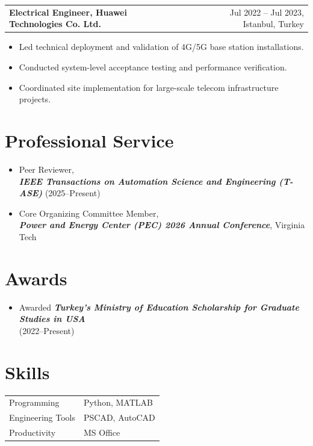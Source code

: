\documentclass[a4paper,12pt]{article}
\makeatletter
\newenvironment{joblong}[2]
    {
    \begin{tabularx}{\linewidth}{@{}l X r@{}}
    \textbf{#1} & \hfill &  #2 \\[3.75pt]
    \end{tabularx}
    \begin{minipage}[t]{\linewidth}
    \begin{itemize}[nosep,after=\strut, leftmargin=1em, itemsep=3pt,label=--]
    }
    {
    \end{itemize}
    \end{minipage}    
    }
\makeatother
\begin{document}
\begin{joblong}{Electrical Engineer, Huawei Technologies Co. Ltd.}{Jul 2022 -- Jul 2023, Istanbul, Turkey}
    \item Led technical deployment and validation of 4G/5G base station installations.
    \item Conducted system-level acceptance testing and performance verification.
    \item Coordinated site implementation for large-scale telecom infrastructure projects.
\end{joblong}


\section{Professional Service}
\begin{itemize}[leftmargin=*, itemsep=2pt]
 \item Peer Reviewer, \\ \textbf{\textit{IEEE Transactions on Automation Science and Engineering (T-ASE)}} (2025--Present)
    \item Core Organizing Committee Member, \\ \textbf{\textit{Power and Energy Center (PEC) 2026 Annual Conference}}, Virginia Tech
\end{itemize}


\section{Awards}
\begin{itemize}[leftmargin=*, itemsep=2pt]
  \item Awarded \textbf{\textit{Turkey’s Ministry of Education Scholarship for Graduate Studies in USA}} \\ (2022–Present)
\end{itemize}


\section{Skills}
\begin{tabularx}{\linewidth}{@{}l X@{}}
Programming & Python, MATLAB \\
Engineering Tools & PSCAD, AutoCAD \\
Productivity & MS Office \\
\end{tabularx}

\vfill
{}
\end{document}
